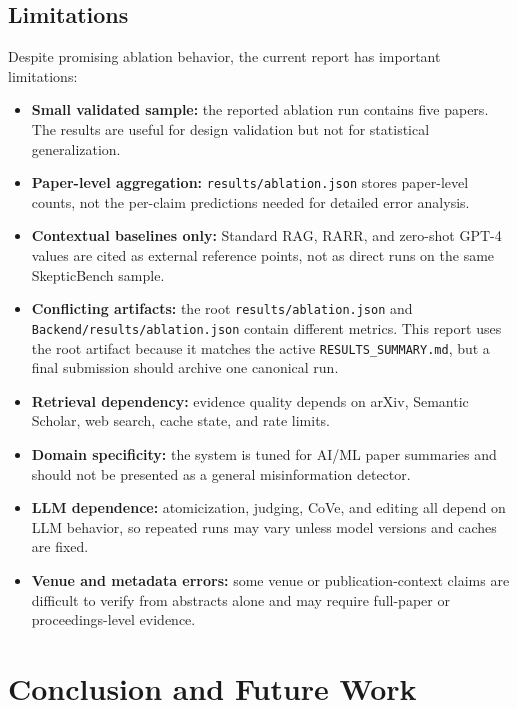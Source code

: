 \documentclass[12pt, a4paper]{report}
\begin{document}
\section{Limitations}
\label{Limitations}

Despite promising ablation behavior, the current report has important
limitations:

\begin{itemize}
    \item \textbf{Small validated sample:} the reported ablation run contains five papers. The results are useful for design validation but not for statistical generalization.
    \item \textbf{Paper-level aggregation:} \texttt{results/ablation.json} stores paper-level counts, not the per-claim predictions needed for detailed error analysis.
    \item \textbf{Contextual baselines only:} Standard RAG, RARR, and zero-shot GPT-4 values are cited as external reference points, not as direct runs on the same SkepticBench sample.
    \item \textbf{Conflicting artifacts:} the root \texttt{results/ablation.json} and \texttt{Backend/results/ablation.json} contain different metrics. This report uses the root artifact because it matches the active \texttt{RESULTS\_SUMMARY.md}, but a final submission should archive one canonical run.
    \item \textbf{Retrieval dependency:} evidence quality depends on arXiv, Semantic Scholar, web search, cache state, and rate limits.
    \item \textbf{Domain specificity:} the system is tuned for AI/ML paper summaries and should not be presented as a general misinformation detector.
    \item \textbf{LLM dependence:} atomicization, judging, CoVe, and editing all depend on LLM behavior, so repeated runs may vary unless model versions and caches are fixed.
    \item \textbf{Venue and metadata errors:} some venue or publication-context claims are difficult to verify from abstracts alone and may require full-paper or proceedings-level evidence.
\end{itemize}


\chapter{Conclusion and Future Work}
\end{document}
